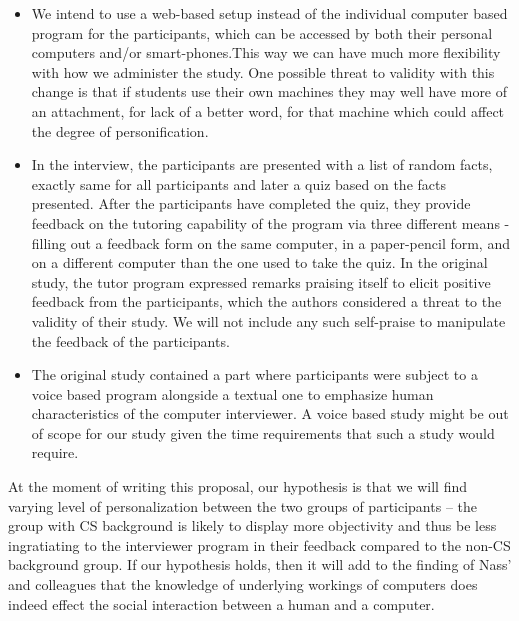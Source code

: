 \documentclass[english]{article}
\begin{document}
\begin{itemize}
    \item We intend to use a web-based setup instead of the individual computer based program for the participants, which can be accessed by both their personal computers and/or smart-phones.This way we can have much more flexibility with how we administer the study. One possible threat to validity with this change is that if students use their own machines they may well have more of an attachment, for lack of a better word, for that machine which could affect the degree of personification. 
    
    \item In the interview, the participants are presented with a list of random facts, exactly same for all participants and later a quiz based on the facts presented. After the participants have completed the quiz, they provide feedback on the tutoring capability of the program via three different means - filling out a feedback form on the same computer, in a paper-pencil form, and on a different computer than the one used to take the quiz. In the original study, the tutor program expressed remarks praising itself to elicit positive feedback from the participants, which the authors considered a threat to the validity of their study. We will not include any such self-praise to manipulate the feedback of the participants.
    
    \item The original study contained a part where participants were subject to a voice based program alongside a textual one to emphasize human characteristics of the computer interviewer. A voice based study might be out of scope for our study given the time requirements that such a study would require.
\end{itemize}

At the moment of writing this proposal, our hypothesis is that we will find varying level of personalization between the two groups of participants -- the group with CS background is likely to display more objectivity and thus be less ingratiating to the interviewer program in their feedback compared to the non-CS background group. If our hypothesis holds, then it will add to the finding of Nass' and colleagues that the knowledge of underlying workings of computers does indeed effect the social interaction between a human and a computer.
\end{document}
